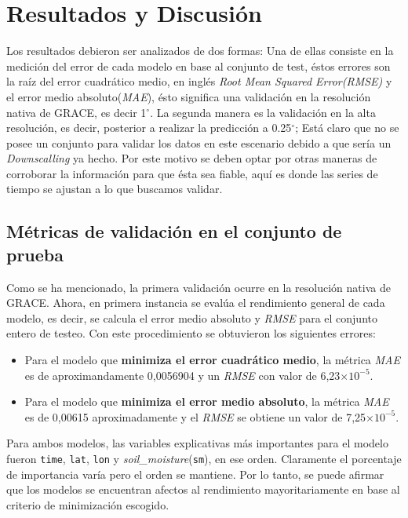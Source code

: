 \chapter{Resultados y Discusión}
\label{C4}
Los resultados debieron ser analizados de dos formas: Una de ellas consiste en la medición del error de cada modelo en base al conjunto de test, éstos errores son la 
raíz del error cuadrático medio, en inglés \textit{Root Mean Squared Error(RMSE)} y el error medio absoluto(\textit{MAE}), ésto significa una validación en la resolución nativa de 
GRACE, es decir 1$^\circ$. La segunda manera es la validación en la alta resolución, es decir, posterior a realizar la predicción a 0.25$^\circ$; Está claro que no se posee
un conjunto para validar los datos en este escenario debido a que sería un \textit{Downscalling} ya hecho. Por este motivo se deben optar por otras maneras de corroborar la información
para que ésta sea fiable, aquí es donde las series de tiempo se ajustan a lo que buscamos validar.

\section{Métricas de validación en el conjunto de prueba }
Como se ha mencionado, la primera validación ocurre en la resolución nativa de GRACE. Ahora, en primera instancia se evalúa el rendimiento general de cada modelo, es decir, 
se calcula el error medio absoluto y \textit{RMSE} para el conjunto entero de testeo. Con este procedimiento se obtuvieron los siguientes errores:

\begin{itemize}
    \item Para el modelo que \textbf{minimiza el error cuadrático medio}, la métrica \textit{MAE} es de aproximandamente 0,0056904 y un \textit{RMSE} con valor de 6,23$ \times 10^{-5}$.
    \item Para el modelo que \textbf{minimiza el error medio absoluto}, la métrica \textit{MAE} es de 0,00615 aproximadamente y el \textit{RMSE} se obtiene un valor de 7,25$ \times 10^{-5}$.
\end{itemize}

Para ambos modelos, las variables explicativas más importantes para el modelo fueron \texttt{time}, \texttt{lat}, \texttt{lon} y \textit{soil\_moisture}(\texttt{sm}), en ese orden. Claramente el porcentaje de importancia
varía pero el orden se mantiene. Por lo tanto, se puede afirmar que los modelos se encuentran afectos al rendimiento mayoritariamente en base al criterio de minimización escogido.

